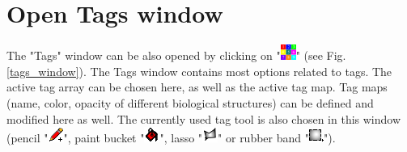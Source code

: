 \section{Open Tags window}
The "Tags" window can be also opened by clicking on "\includegraphics[scale=0.7]{images/04/tag_edit.png}" (see Fig. \ref{tags_window}). The Tags window contains most options related to tags. The active tag array can be chosen here, as well as the active tag map. Tag maps (name, color, opacity of different biological structures) can be defined and modified here as well. The currently used tag tool is also chosen in this window (pencil "\includegraphics[scale=0.7]{images/12/pencil.png}", paint bucket "\includegraphics[scale=0.7]{images/12/paint_bucket.png}", lasso "\includegraphics[scale=0.7]{images/12/lasso.png}" or rubber band "\includegraphics[scale=0.7]{images/12/rubber_band.png}"). 


